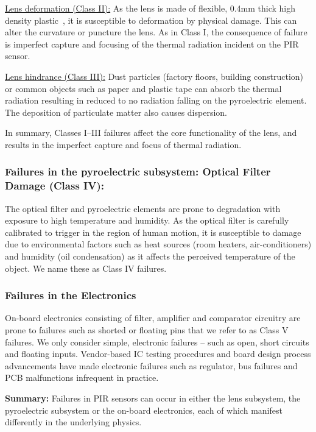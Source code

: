 \noindent \underline{Lens deformation (Class II):} As the lens is made of flexible, 0.4mm thick high density plastic~\cite{fresnel}, it is susceptible to deformation by physical damage. This can alter the curvature or puncture the lens. %
As in Class I, the consequence of failure is imperfect capture and focusing of the thermal radiation incident on the PIR sensor.

\noindent \underline{Lens hindrance (Class III):} Dust particles (\eg factory floors, building construction) or common objects such as paper and plastic tape can absorb the thermal radiation resulting in reduced to no radiation falling on the pyroelectric element. The deposition of particulate matter also causes dispersion.

In summary, Classes I--III failures affect the core functionality of the lens, and results in the imperfect capture and focus of thermal radiation.

\subsubsection{\textbf{Failures in the pyroelectric subsystem}: Optical Filter Damage (Class IV):} %
The optical filter and pyroelectric elements are prone to degradation with exposure to high temperature and humidity. As the optical filter is carefully calibrated to trigger in the region of human motion, it is susceptible to damage due to environmental factors such as heat sources (\eg room heaters, air-conditioners) and humidity (\eg oil condensation) as it affects the perceived temperature of the object. We name these as Class IV failures.

\subsubsection{\textbf{Failures in the Electronics}} On-board electronics consisting of filter, amplifier and comparator circuitry are prone to failures such as shorted or floating pins that we refer to as Class V failures. We only consider simple, electronic failures -- such as open, short circuits and floating inputs. Vendor-based IC testing procedures and board design process advancements have made electronic failures such as regulator, bus failures and PCB malfunctions infrequent in practice.
%
%

\noindent \textbf{Summary:} Failures in PIR sensors can occur in either the lens subsystem, the pyroelectric subsystem or the on-board electronics, each of which manifest differently in the underlying physics.

